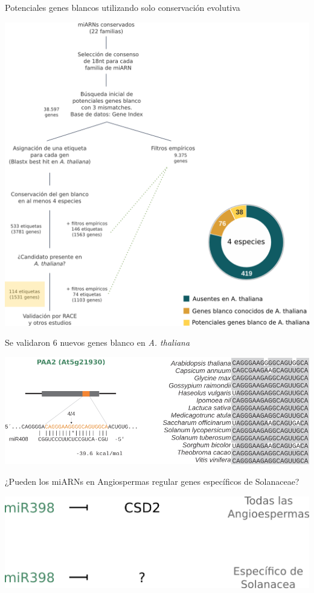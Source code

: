 \documentclass{beamer}
\begin{document}
\begin{frame}{Potenciales genes blancos utilizando solo conservación evolutiva}
	\begin{center}
		\includegraphics[width=.7\textwidth]{img/NAR_fig01y03.png}
	\end{center}
\end{frame}

\begin{frame}{Se validaron 6 nuevos genes blanco en \textit{A. thaliana}}
	\begin{center}
		\includegraphics[width=1\textwidth]{img/Figure4_retocada_nueva01.png}
	\end{center}
\end{frame}



\begin{frame}{¿Pueden los miARNs en Angiospermas regular genes específicos de Solanaceae?}
	\begin{center}
		\includegraphics[width=.8\textwidth]{img/miR398_solanaceae.png}
	\end{center}
\end{frame}
\end{document}
